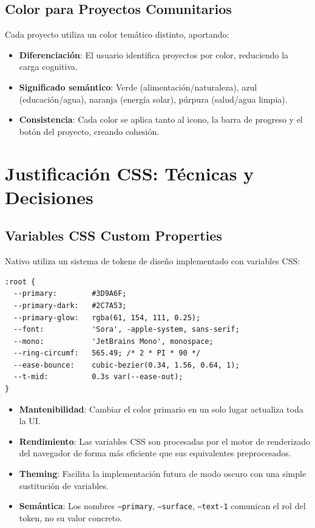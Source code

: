 \documentclass[12pt, a4paper]{article}
\begin{document}
\subsection{Color para Proyectos Comunitarios}

Cada proyecto utiliza un color temático distinto, aportando:
\begin{itemize}
  \item \textbf{Diferenciación}: El usuario identifica proyectos por color, reduciendo la carga cognitiva.
  \item \textbf{Significado semántico}: Verde (alimentación/naturaleza), azul (educación/agua), naranja (energía solar), púrpura (salud/agua limpia).
  \item \textbf{Consistencia}: Cada color se aplica tanto al icono, la barra de progreso y el botón del proyecto, creando cohesión.
\end{itemize}

\newpage
\section{Justificación CSS: Técnicas y Decisiones}

\subsection{Variables CSS Custom Properties}

Nativo utiliza un sistema de tokens de diseño implementado con variables CSS:

\begin{lstlisting}[style=css, caption={Variables CSS de Nativo (extracto)}]
:root {
  --primary:        #3D9A6F;
  --primary-dark:   #2C7A53;
  --primary-glow:   rgba(61, 154, 111, 0.25);
  --font:           'Sora', -apple-system, sans-serif;
  --mono:           'JetBrains Mono', monospace;
  --ring-circumf:   565.49; /* 2 * PI * 90 */
  --ease-bounce:    cubic-bezier(0.34, 1.56, 0.64, 1);
  --t-mid:          0.3s var(--ease-out);
}
\end{lstlisting}

\begin{justificacionbox}
\begin{itemize}
  \item \textbf{Mantenibilidad}: Cambiar el color primario en un solo lugar actualiza toda la UI.
  \item \textbf{Rendimiento}: Las variables CSS son procesadas por el motor de renderizado del navegador de forma más eficiente que sus equivalentes preprocesados.
  \item \textbf{Theming}: Facilita la implementación futura de modo oscuro con una simple sustitución de variables.
  \item \textbf{Semántica}: Los nombres \texttt{--primary}, \texttt{--surface}, \texttt{--text-1} comunican el rol del token, no su valor concreto.
\end{itemize}
\end{justificacionbox}
\end{document}
